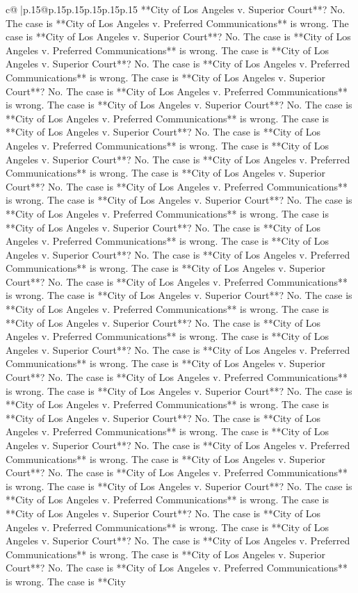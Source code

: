 \documentclass{article}
\begin{document}
{\begin{supertabular}{c@{$\;$}|p{.15\linewidth}@{}p{.15\linewidth}p{.15\linewidth}p{.15\linewidth}p{.15\linewidth}p{.15\linewidth}}
{{{**City of Los Angeles v. Superior Court**? No. The case is **City of Los Angeles v. Preferred Communications** is wrong. The case is **City of Los Angeles v. Superior Court**? No. The case is **City of Los Angeles v. Preferred Communications** is wrong. The case is **City of Los Angeles v. Superior Court**? No. The case is **City of Los Angeles v. Preferred Communications** is wrong. The case is **City of Los Angeles v. Superior Court**? No. The case is **City of Los Angeles v. Preferred Communications** is wrong. The case is **City of Los Angeles v. Superior Court**? No. The case is **City of Los Angeles v. Preferred Communications** is wrong. The case is **City of Los Angeles v. Superior Court**? No. The case is **City of Los Angeles v. Preferred Communications** is wrong. The case is **City of Los Angeles v. Superior Court**? No. The case is **City of Los Angeles v. Preferred Communications** is wrong. The case is **City of Los Angeles v. Superior Court**? No. The case is **City of Los Angeles v. Preferred Communications** is wrong. The case is **City of Los Angeles v. Superior Court**? No. The case is **City of Los Angeles v. Preferred Communications** is wrong. The case is **City of Los Angeles v. Superior Court**? No. The case is **City of Los Angeles v. Preferred Communications** is wrong. The case is **City of Los Angeles v. Superior Court**? No. The case is **City of Los Angeles v. Preferred Communications** is wrong. The case is **City of Los Angeles v. Superior Court**? No. The case is **City of Los Angeles v. Preferred Communications** is wrong. The case is **City of Los Angeles v. Superior Court**? No. The case is **City of Los Angeles v. Preferred Communications** is wrong. The case is **City of Los Angeles v. Superior Court**? No. The case is **City of Los Angeles v. Preferred Communications** is wrong. The case is **City of Los Angeles v. Superior Court**? No. The case is **City of Los Angeles v. Preferred Communications** is wrong. The case is **City of Los Angeles v. Superior Court**? No. The case is **City of Los Angeles v. Preferred Communications** is wrong. The case is **City of Los Angeles v. Superior Court**? No. The case is **City of Los Angeles v. Preferred Communications** is wrong. The case is **City of Los Angeles v. Superior Court**? No. The case is **City of Los Angeles v. Preferred Communications** is wrong. The case is **City of Los Angeles v. Superior Court**? No. The case is **City of Los Angeles v. Preferred Communications** is wrong. The case is **City of Los Angeles v. Superior Court**? No. The case is **City of Los Angeles v. Preferred Communications** is wrong. The case is **City of Los Angeles v. Superior Court**? No. The case is **City of Los Angeles v. Preferred Communications** is wrong. The case is **City of Los Angeles v. Superior Court**? No. The case is **City of Los Angeles v. Preferred Communications** is wrong. The case is **City of Los Angeles v. Superior Court**? No. The case is **City of Los Angeles v. Preferred Communications** is wrong. The case is **City of Los Angeles v. Superior Court**? No. The case is **City of Los Angeles v. Preferred Communications** is wrong. The case is **City }}}
\end{supertabular}}
\end{document}
